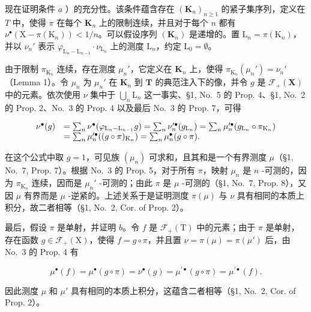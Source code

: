 现在证明条件 \(a\) ）的充分性。该条件蕴含存在 \((\mathbf{K}_n)_{n \geqslant 1}\) 的紧子集序列，定义在 \(T\) 中，使得 \(\pi\) 在每个 \(\mathbf{K}_n\) 上的限制连续，并且对于每个 \(n\) 都有 \(\nu^{\bullet}(\mathrm{X} - \pi(\mathrm{K}_n)) < 1/n\)。可以假设序列 \((\mathbf{K}_n)\) 是递增的。置 \(\mathrm{L}_n = \pi(\mathrm{K}_n)\)，并以 \(\nu_n'\) 表示 \(\varphi_{\mathrm{L}_n - \mathrm{L}_{n-1}} \cdot \nu_{\mathrm{L}_n}\) 上的测度 \(\mathrm{L}_n\)，约定 \(\mathrm{L}_0 = \emptyset\)。

由于限制 \(\pi_{\mathrm{K}_n}\) 连续，存在测度 \(\mu_n'\)，它定义在 \(\mathbf{K}_n\) 上，使得 \(\pi_{\mathrm{K}_n}(\mu_n') = \nu_n'\)（Lemma 1）。令 \(\mu_n\) 为 \(\mu_n'\) 在 \(\mathbf{K}_n\) 到 \(\mathbf{T}\) 的典范注入下的像，并令 \(g\) 是 \(\mathcal{F}_{+}(\mathbf{X})\) 中的元素。依次使用 \(\nu\) 集中于 \(\bigcup_{n} \mathrm{L}_n\) 这一事实、§1, No.~5 的 Prop. 4、§1, No.~2 的 Prop. 2、No.~3 的 Prop. 4 以及最后 No.~3 的 Prop. 7，可得

\[
\begin{array}{r l} \nu^ {\bullet} (g) & = \sum_ {n} \nu^ {\bullet} (\varphi_ {\mathrm{L} _ {n} - \mathrm{L} _ {n - 1}} g) = \sum_ {n} \nu_ {n} ^ {\prime   \bullet} (g _ {\mathrm{L} _ {n}}) = \sum_ {n} \mu_ {n} ^ {\prime   \bullet} (g _ {\mathrm{L} _ {n}} \circ \pi_ {\mathrm{K} _ {n}}) \\ & = \sum_ {n} \mu_ {n} ^ {\prime   \bullet} ((g \circ \pi) _ {\mathrm{K} _ {n}}) = \sum_ {n} \mu_ {n} ^ {\bullet} (g \circ \pi). \end{array}
\]

在这个公式中取 \(g = 1\)，可见族 \((\mu_n)\) 可求和，且其和是一个有界测度 \(\mu\)（§1, No.~7, Prop. 7）。根据 No.~3 的 Prop. 5，对于所有 \(\pi\)，映射 \(\mu_n\) 是 \(n\) -可测的，因为 \(\pi_{\mathrm{K}_n}\) 连续，因而是 \(\mu_n'\) -可测的；由此 \(\pi\) 是 \(\mu\) -可测的（§1, No.~7, Prop. 8），又因 \(\mu\) 有界而是 \(\mu\) -逆紧的。上述关系于是证明测度 \(\pi(\mu)\) 与 \(\nu\) 具有相同的本质上积分，故二者相等（§1, No.~2, Cor. of Prop. 2）。

最后，假设 \(\pi\) 是单射，并证明 \(b\)。令 \(f\) 是 \(\mathcal{F}_{+}(\mathrm{T})\) 中的元素；由于 \(\pi\) 是单射，存在函数 \(g \in \mathcal{F}_{+}(\mathrm{X})\)，使得 \(f = g \circ \pi\)，并且置 \(\nu = \pi(\mu) = \pi(\mu')\) 后，由 No.~3 的 Prop. 4 有

\[
\mu^ {\bullet} (f) = \mu^ {\bullet} (g \circ \pi) = \nu^ {\bullet} (g) = \mu^ {\prime \bullet} (g \circ \pi) = \mu^ {\prime \bullet} (f).
\]

因此测度 \(\mu\) 和 \(\mu'\) 具有相同的本质上积分，这蕴含二者相等（§1, No.~2, Cor. of Prop. 2）。

